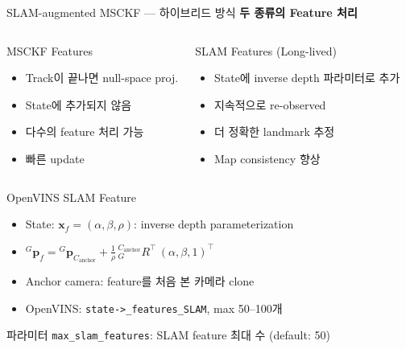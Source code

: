\begin{frame}[shrink=10]{SLAM-augmented MSCKF — 하이브리드 방식}
  \textbf{두 종류의 Feature 처리}
  \vspace{0.2em}
  \begin{columns}[T]
      \begin{block}{MSCKF Features}
        \begin{itemize}
          \item Track이 끝나면 null-space proj.
          \item State에 추가되지 않음
          \item 다수의 feature 처리 가능
          \item 빠른 update
        \end{itemize}
      \end{block}
      \begin{block}{SLAM Features (Long-lived)}
        \begin{itemize}
          \item State에 inverse depth 파라미터로 추가
          \item 지속적으로 re-observed
          \item 더 정확한 landmark 추정
          \item Map consistency 향상
        \end{itemize}
      \end{block}
  \end{columns}
  \begin{block}{OpenVINS SLAM Feature}
    \begin{itemize}
      \item State: $\bm{x}_f = (\alpha, \beta, \rho)$: inverse depth parameterization
      \item ${}^G\bm{p}_f = {}^G\bm{p}_{C_{\text{anchor}}} + \frac{1}{\rho}\,{}^{C_\text{anchor}}_G R^\top\,(\alpha,\beta,1)^\top$
      \item Anchor camera: feature를 처음 본 카메라 clone
      \item OpenVINS: \texttt{state->\_features\_SLAM}, max 50--100개
    \end{itemize}
  \end{block}
  \begin{exampleblock}{파라미터}
    \texttt{max\_slam\_features}: SLAM feature 최대 수 (default: 50)
  \end{exampleblock}
\end{frame}

